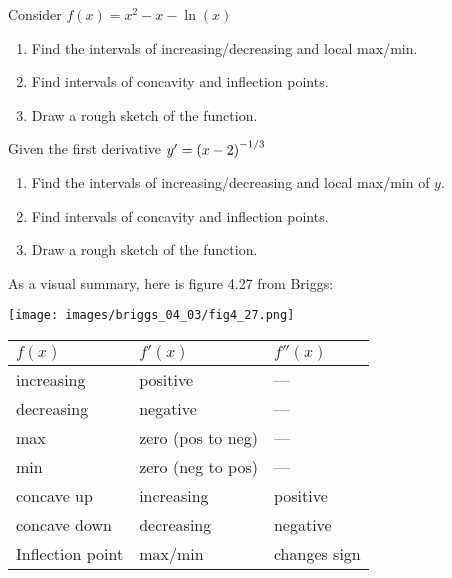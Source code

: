 \documentclass[answers]{exam}
\begin{document}
\begin{ex*}
  Consider $f(x)=x^2-x-\ln(x)$
\end{ex*}
\begin{enumerate}[itemsep=\stretch{1}, label=\alph*)]
  \item Find the intervals of increasing/decreasing and local max/min.
  \item Find intervals of concavity and inflection points.
  \item Draw a rough sketch of the function.
\end{enumerate}
\pagebreak

\begin{ex*}
  Given the first derivative $y'=\parens{x-2}\inv[1/3]$
\end{ex*}
\begin{enumerate}[itemsep=\stretch{1}, label=\alph*)]
  \item Find the intervals of increasing/decreasing and local max/min of $y$.
  \item Find intervals of concavity and inflection points.
  \item Draw a rough sketch of the function.
\end{enumerate}
\pagebreak

As a visual summary, here is figure 4.27 from Briggs:
\begin{center}
  \texttt{[image: images/briggs\_04\_03/fig4\_27.png]}
\end{center}
\begin{center}
  \begin{tabularx}{0.95\linewidth}{*{3}{X}}\toprule
    $f(x)$& $f'(x)$& $f''(x)$\\\midrule
    increasing& positive& ---\\
    decreasing& negative& ---\\
    max& zero (pos to neg)& ---\\
    min& zero (neg to pos)& ---\\
    concave up& increasing& positive\\
    concave down& decreasing& negative\\
    Inflection point& max/min& changes sign\\\bottomrule
  \end{tabularx}
\end{center}
\pagebreak
\end{document}
